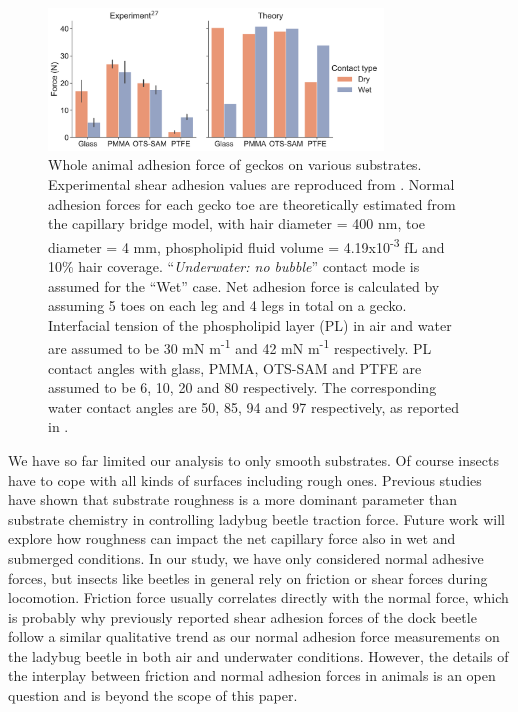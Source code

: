\documentclass[vruler,JEB]{COB}%
\begin{document}
\begin{figure}
\centering
\includegraphics[width=3.5in]{Figure-9-Gecko_comparison}\caption{\label{fig:Comparison-with-model}Whole animal adhesion force of geckos
on various substrates. Experimental shear adhesion values are reproduced
from \citep{RN15}. Normal adhesion forces for each gecko
toe are theoretically estimated from the capillary bridge model, with
hair diameter = 400 nm, toe diameter = 4 mm, phospholipid fluid volume
= 4.19x10\protect\textsuperscript{-3} fL and 10\% hair coverage.
\textquotedblleft\emph{Underwater: no bubble}\textquotedblright{}
contact mode is assumed for the \textquotedblleft Wet\textquotedblright{}
case. Net adhesion force is calculated by assuming 5 toes on each
leg and 4 legs in total on a gecko. Interfacial tension of the phospholipid
layer (PL) in air and water are assumed to be 30 mN m\protect\textsuperscript{-1} and 42 mN m\protect\textsuperscript{-1}
respectively. PL contact angles with glass, PMMA, OTS-SAM and PTFE
are assumed to be 6\textdegree , 10\textdegree , 20\textdegree{} and
80\textdegree{} respectively. The corresponding water contact angles
are 50\textdegree , 85\textdegree , 94\textdegree{} and 97\textdegree{}
respectively, as reported in \citep{RN15}.}
\end{figure}

We have so far limited our analysis to only smooth substrates. Of course insects
have to cope with all kinds of surfaces including rough ones.
Previous studies \citep{RN136} have shown that substrate roughness
is a more dominant parameter than substrate chemistry in controlling
ladybug beetle traction force. Future work will explore how roughness can impact
the net capillary force also in wet and submerged conditions. In our study, we have only considered normal adhesive forces, but insects like beetles in general rely on friction or shear forces during locomotion. Friction force usually correlates directly with the normal force, which is probably why previously reported shear adhesion forces of the dock beetle \citep{RN87} follow a similar qualitative trend as our normal adhesion force measurements on the ladybug beetle in both air and underwater conditions. However, the details of the interplay between friction and normal adhesion forces in animals is an open question and is beyond the scope of this paper. 
\end{document}
